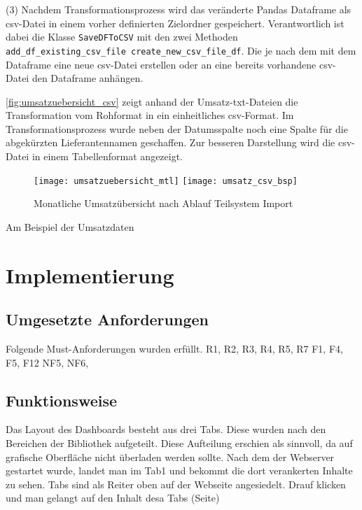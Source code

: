     (3) Nachdem Transformationsprozess wird das veränderte Pandas Dataframe als csv-Datei in einem vorher definierten Zielordner gespeichert. 
    Verantwortlich ist dabei die Klasse \texttt{SaveDFToCSV} mit den zwei Methoden \texttt{add\_df\_existing\_csv\_file create\_new\_csv\_file\_df}. 
    Die je nach dem mit dem Dataframe eine neue csv-Datei erstellen oder an eine bereits vorhandene csv-Datei den Dataframe anhängen.
    
    \autoref{fig:umsatzuebersicht_csv} zeigt anhand der Umsatz-txt-Dateien die Transformation vom Rohformat in ein einheitliches csv-Format. 
    Im Transformationsprozess wurde neben der Datumsspalte noch eine Spalte für die abgekürzten Lieferantennamen geschaffen. Zur besseren Darstellung
    wird die csv-Datei in einem Tabellenformat angezeigt.

    \begin{figure}[h]
        \centering
            \texttt{[image: umsatzuebersicht\_mtl]}
            \texttt{[image: umsatz\_csv\_bsp]}
            \caption{Monatliche Umsatzübersicht nach Ablauf Teilsystem Import}
            \label{fig:umsatzuebersicht_csv}
    \end{figure}
    

    Am Beispiel der Umsatzdaten 
    

\section{Implementierung}

  

    \subsection{Umgesetzte Anforderungen}
    Folgende Must-Anforderungen wurden erfüllt.
    R1, R2, R3, R4, R5, R7
    F1, F4, F5, F12
    NF5, NF6, 
    \subsection{Funktionsweise}
    Das Layout des Dashboards besteht aus drei Tabs. Diese wurden nach den Bereichen der Bibliothek aufgeteilt. Diese Aufteilung erschien als sinnvoll,
    da auf grafische Oberfläche nicht überladen werden sollte.
    Nach dem der Webserver gestartet wurde, landet man im Tab1 und bekommt die dort verankerten Inhalte zu sehen.
    Tabs sind als Reiter oben auf der Webseite angesiedelt.
    Drauf klicken und man gelangt auf den Inhalt desa Tabs (Seite)
    
